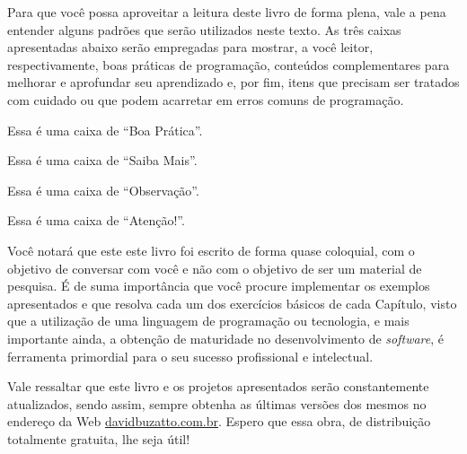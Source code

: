 Para que você possa aproveitar a leitura deste livro de forma plena, vale a pena entender alguns padrões que serão utilizados neste texto. As três caixas apresentadas abaixo serão empregadas para mostrar, a você leitor, respectivamente, boas práticas de programação, conteúdos complementares para melhorar e aprofundar seu aprendizado e, por fim, itens que precisam ser tratados com cuidado ou que podem acarretar em erros comuns de programação.

\begin{boaPratica}
    Essa é uma caixa de ``Boa Prática''.
\end{boaPratica}

\begin{saibaMais}
    Essa é uma caixa de ``Saiba Mais''.
\end{saibaMais}

\begin{observacao}
    Essa é uma caixa de ``Observação''.
\end{observacao}

\begin{atencao}
    Essa é uma caixa de ``Atenção!''.
\end{atencao}

Você notará que este este livro foi escrito de forma quase coloquial, com o objetivo de conversar com você e não com o objetivo de ser um material de pesquisa. É de suma importância que você procure implementar os exemplos apresentados e que resolva cada um dos exercícios básicos de cada Capítulo, visto que a utilização de uma linguagem de programação ou tecnologia, e mais importante ainda, a obtenção de maturidade no desenvolvimento de \textit{software}, é ferramenta primordial para o seu sucesso profissional e intelectual.

Vale ressaltar que este livro e os projetos apresentados serão constantemente atualizados, sendo assim, sempre obtenha as últimas versões dos mesmos no endereço da Web \textcolor{corTema}{\href{http://davidbuzatto.com.br}{davidbuzatto.com.br}}. Espero que essa obra, de distribuição totalmente gratuita, lhe seja útil!
    

\vspace*{\fill}
